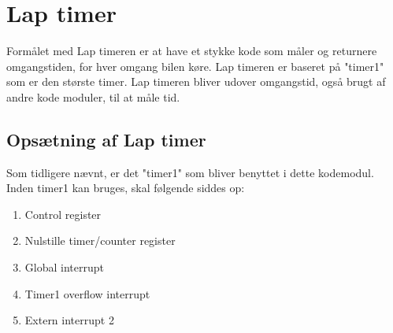 \newpage

\section{Lap timer}
\label{lapt}
Formålet med Lap timeren er at have et stykke kode som måler og returnere omgangstiden, for hver omgang bilen køre. Lap timeren er baseret på "timer1" som er den største timer. Lap timeren bliver udover omgangstid, også brugt af andre kode moduler, til at måle tid.
\subsection{Opsætning af Lap timer}
Som tidligere nævnt, er det "timer1" som bliver benyttet i dette kodemodul. Inden timer1 kan bruges, skal følgende siddes op:
\begin{enumerate}
\item Control register
\item Nulstille timer/counter register
\item Global interrupt
\item Timer1 overflow interrupt
\item Extern interrupt 2 
\end{enumerate}

